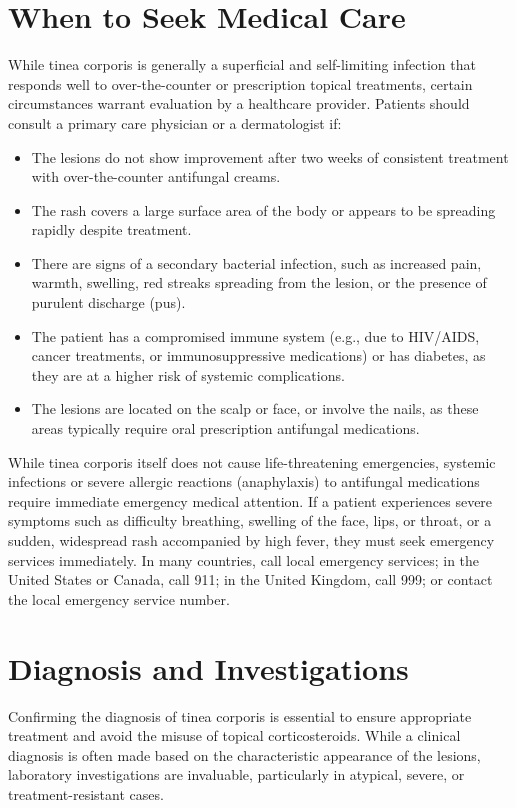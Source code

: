 \section*{When to Seek Medical Care}
While tinea corporis is generally a superficial and self-limiting infection that responds well to over-the-counter or prescription topical treatments, certain circumstances warrant evaluation by a healthcare provider. Patients should consult a primary care physician or a dermatologist if:
\begin{itemize}
    \item The lesions do not show improvement after two weeks of consistent treatment with over-the-counter antifungal creams.
    \item The rash covers a large surface area of the body or appears to be spreading rapidly despite treatment.
    \item There are signs of a secondary bacterial infection, such as increased pain, warmth, swelling, red streaks spreading from the lesion, or the presence of purulent discharge (pus).
    \item The patient has a compromised immune system (e.g., due to HIV/AIDS, cancer treatments, or immunosuppressive medications) or has diabetes, as they are at a higher risk of systemic complications.
    \item The lesions are located on the scalp or face, or involve the nails, as these areas typically require oral prescription antifungal medications.
\end{itemize}

While tinea corporis itself does not cause life-threatening emergencies, systemic infections or severe allergic reactions (anaphylaxis) to antifungal medications require immediate emergency medical attention. If a patient experiences severe symptoms such as difficulty breathing, swelling of the face, lips, or throat, or a sudden, widespread rash accompanied by high fever, they must seek emergency services immediately. In many countries, call local emergency services; in the United States or Canada, call 911; in the United Kingdom, call 999; or contact the local emergency service number.

\section*{Diagnosis and Investigations}
Confirming the diagnosis of tinea corporis is essential to ensure appropriate treatment and avoid the misuse of topical corticosteroids. While a clinical diagnosis is often made based on the characteristic appearance of the lesions, laboratory investigations are invaluable, particularly in atypical, severe, or treatment-resistant cases.

